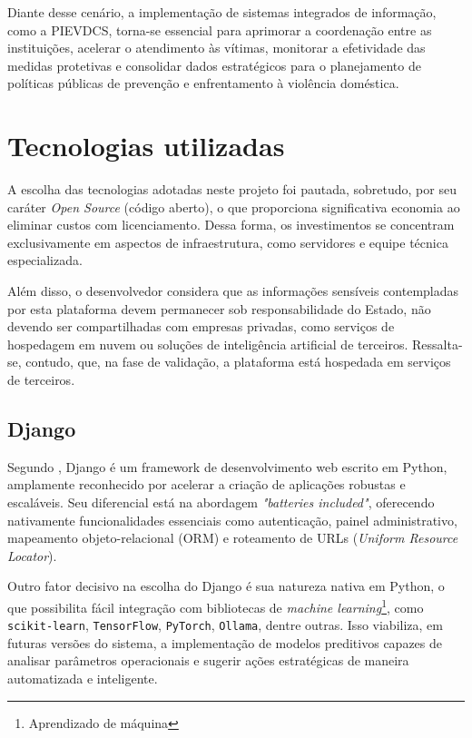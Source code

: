 \par Diante desse cenário, a implementação de sistemas integrados de informação, como a PIEVDCS, torna-se essencial para aprimorar a coordenação entre as instituições, acelerar o atendimento às vítimas, monitorar a efetividade das medidas protetivas e consolidar dados estratégicos para o planejamento de políticas públicas de prevenção e enfrentamento à violência doméstica.


\section{Tecnologias utilizadas}
\par A escolha das tecnologias adotadas neste projeto foi pautada, sobretudo, por seu caráter \textit{Open Source} (código aberto), o que proporciona significativa economia ao eliminar custos com licenciamento. Dessa forma, os investimentos se concentram exclusivamente em aspectos de infraestrutura, como servidores e equipe técnica especializada.
\par Além disso, o desenvolvedor considera que as informações sensíveis contempladas por esta plataforma devem permanecer sob responsabilidade do Estado, não devendo ser compartilhadas com empresas privadas, como serviços de hospedagem em nuvem ou soluções de inteligência artificial de terceiros. Ressalta-se, contudo, que, na fase de validação, a plataforma está hospedada em serviços de terceiros.

\subsection{Django}
\par Segundo , Django é um framework de desenvolvimento web escrito em Python, amplamente reconhecido por acelerar a criação de aplicações robustas e escaláveis. Seu diferencial está na abordagem \textit{"batteries included"}, oferecendo nativamente funcionalidades essenciais como autenticação, painel administrativo, mapeamento objeto-relacional (ORM) e roteamento de URLs (\textit{Uniform Resource Locator}).
\par Outro fator decisivo na escolha do Django é sua natureza nativa em Python, o que possibilita fácil integração com bibliotecas de \textit{machine learning}\footnote{Aprendizado de máquina}, como \texttt{scikit-learn}, \texttt{TensorFlow}, \texttt{PyTorch}, \texttt{Ollama}, dentre outras. Isso viabiliza, em futuras versões do sistema, a implementação de modelos preditivos capazes de analisar parâmetros operacionais e sugerir ações estratégicas de maneira automatizada e inteligente.


